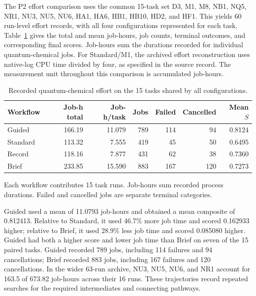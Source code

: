 The P2 effort comparison uses the common 15-task set D3, M1, M8, NB1, NQ5, NR1, NU3, NU5, NU6, HA1, HA6, HB1, HB10, HD2, and HF1. This yields 60 run-level effort records, with all four configurations represented for each task. Table~\ref{tab:si-common-effort} gives the total and mean job-hours, job counts, terminal outcomes, and corresponding final scores. Job-hours sum the durations recorded for individual quantum-chemical jobs. For Standard/M1, the archived effort reconstruction uses native-log CPU time divided by four, as specified in the source record. The measurement unit throughout this comparison is accumulated job-hours.

\begin{table}[!htbp]
\centering
\small
\caption{Recorded quantum-chemical effort on the 15 tasks shared by all configurations.}
\label{tab:si-common-effort}
\begin{tabular}{lrrrrrr}
\toprule
Workflow & Job-h total & Job-h/task & Jobs & Failed & Cancelled & Mean $S$ \\
\midrule
Guided & 166.19 & 11.079 & 789 & 114 & 94 & 0.8124 \\
Standard & 113.32 & 7.555 & 419 & 45 & 50 & 0.6495 \\
Record & 118.16 & 7.877 & 431 & 62 & 38 & 0.7360 \\
Brief & 233.85 & 15.590 & 883 & 167 & 120 & 0.7273 \\
\bottomrule
\end{tabular}
\par\smallskip\begin{minipage}{\linewidth}\footnotesize Each workflow contributes 15 task runs. Job-hours sum recorded process durations. Failed and cancelled jobs are separate terminal categories.\end{minipage}
\end{table}

Guided used a mean of 11.0793 job-hours and obtained a mean composite of 0.812413. Relative to Standard, it used 46.7\% more job time and scored 0.162933 higher; relative to Brief, it used 28.9\% less job time and scored 0.085080 higher. Guided had both a higher score and lower job time than Brief on seven of the 15 paired tasks. Guided recorded 789 jobs, including 114 failures and 94 cancellations; Brief recorded 883 jobs, including 167 failures and 120 cancellations. In the wider 63-run archive, NU3, NU5, NU6, and NR1 account for 163.5 of 673.82 job-hours across their 16 runs. These trajectories record repeated searches for the required intermediates and connecting pathways.

